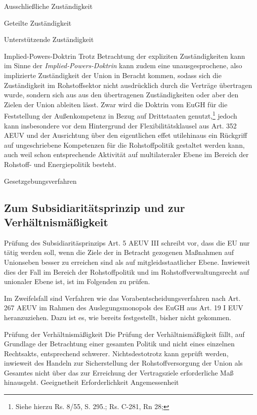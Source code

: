 \documentclass[12pt,a4paper,oneside]{book} %
\begin{document}
	Ausschließliche Zuständigkeit
	
	Geteilte Zuständigkeit
	
	Unterstützende Zuständigkeit
	
	Implied-Powers-Doktrin
	Trotz Betrachtung der expliziten Zuständigkeiten kann im Sinne der \textit{Implied-Powers-Doktrin} kann zudem eine unausgesprochene, also implizierte Zuständigkeit der Union in Beracht kommen, sodass sich die Zuständigkeit im Rohstoffsektor nicht ausdrücklich durch die Verträge übertragen wurde, sondern sich aus aus den übertragenen Zuständigkeiten oder aber den Zielen der Union ableiten lässt. Zwar wird die Doktrin vom EuGH für die Feststellung der Außenkompetenz in Bezug auf Drittstaaten genutzt,\footnote{Siehe hierzu Rs. 8/55, S. 295.; Rs. C-281, Rn 28; } jedoch kann insbesondere vor dem Hintergrund der Flexibilitätsklausel aus Art. 352 AEUV und der Ausrichtung über den eigentlichen \glqq effet utile\glqq hinaus\autocite{Callies/Ruffert, Art. 352 AEUV., Rn. 67} ein Rückgriff auf ungeschriebene Kompetenzen für die Rohstoffpolitik gestaltet werden kann, auch weil schon entsprechende Aktivität auf multilateraler Ebene im Bereich der Rohstoff- und Energiepolitik besteht.\autocites{EU 6 - 3000 - 025/24, S. 8}{Bungenberg, in: Pechstein/Nowak/Häde, Frankfurter Kommentar EUV/GRC/AEUV, 2. Auflage 2023, AEUV, Art. 207, Rn. 223.}
	
	Gesetzgebungsverfahren
	
		\subsection{Zum Subsidiaritätsprinzip und zur Verhältnismäßigkeit}
	Prüfung des Subsidiaritäsprinzips
	Art. 5 AEUV III schreibt vor, dass die EU nur tätig werden soll, wenn die Ziele der in Betracht gezogenen Maßnahmen auf Unionseben besser zu erreichen sind als auf mitgleidsstaatlicher Ebene. Inwieweit dies der Fall im Bereich der Rohstoffpolitik und im Rohstoffverwaltungsrecht auf unionaler Ebene ist, ist im Folgenden zu prüfen.
	
	Im Zweifelsfall sind Verfahren wie das Vorabentscheidungsverfahren nach Art. 267 AEUV im Rahmen des Auslegungsmonopols des EuGH\autocites[siehe zum Auslegungsmonopol]{Kühn, EuZW 2023, 925}{Streinz, EUV/AEUV, Art. 267, Rn. 6} aus Art. 19 I EUV heranzuziehen. Dazu ist es, wie bereits festgestellt, bisher nicht gekommen.
	
	Prüfung der Verhältnismäßigkeit
	Die Prüfung der Verhältnismäßigkeit fällt, auf Grundlage der Betrachtung einer gesamten Politik und nicht eines einzelnen Rechtsakts, entsprechend schwerer. Nichtsdestotrotz kann geprüft werden, inwieweit des Handeln zur Sicherstellung der Rohstoffversorgung der Union als Gesamtes nicht über das zur Erreichung der Vertragsziele erforderliche Maß hinausgeht.
	Geeignetheit
	Erforderlichkeit
	Angemessenheit
	
\end{document}
